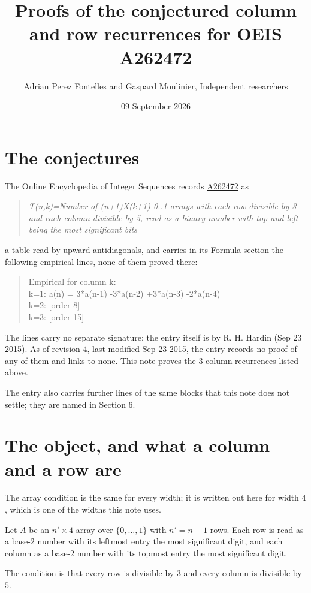 \documentclass[11pt]{article}
\title{Proofs of the conjectured column and row recurrences for OEIS A262472}
\author{Adrian Perez Fontelles and Gaspard Moulinier, Independent researchers}
\date{09 September 2026}
\theoremstyle{definition}
\begin{document}
\maketitle
\section{The conjectures}

The Online Encyclopedia of Integer Sequences records \href{https://oeis.org/A262472}{A262472} as

\begin{quote}\itshape T(n,k)=Number of (n+1)X(k+1) 0..1 arrays with each row divisible by 3 and each column divisible by 5, read as a binary number with top and left being the most significant bits\end{quote}

a table read by upward antidiagonals, and carries in its Formula section the following empirical lines, none of them proved there:

\begin{quote}\ttfamily Empirical for column k:\\
k=1: a(n) = 3*a(n-1) -3*a(n-2) +3*a(n-3) -2*a(n-4)\\k=2: [order 8]\\k=3: [order 15]\end{quote}

The lines carry no separate signature; the entry itself is by R. H. Hardin (Sep 23 2015). As of revision 4, last modified Sep 23 2015, the entry records no proof of any of them and links to none. This note proves the 3 column recurrences listed above.

The entry also carries further lines of the same blocks that this note does not settle; they are named in Section 6.

\section{The object, and what a column and a row are}

The array condition is the same for every width; it is written out here for width $4$, which is one of the widths this note uses.

Let $A$ be an $n' \times 4$ array over $\{0,\dots,1\}$ with $n' = n + 1$ rows. Each row is read as a base-$2$ number with its leftmost entry the most significant digit, and each column as a base-$2$ number with its topmost entry the most significant digit.

The condition is that every row is divisible by $3$ and every column is divisible by $5$.
\end{document}
